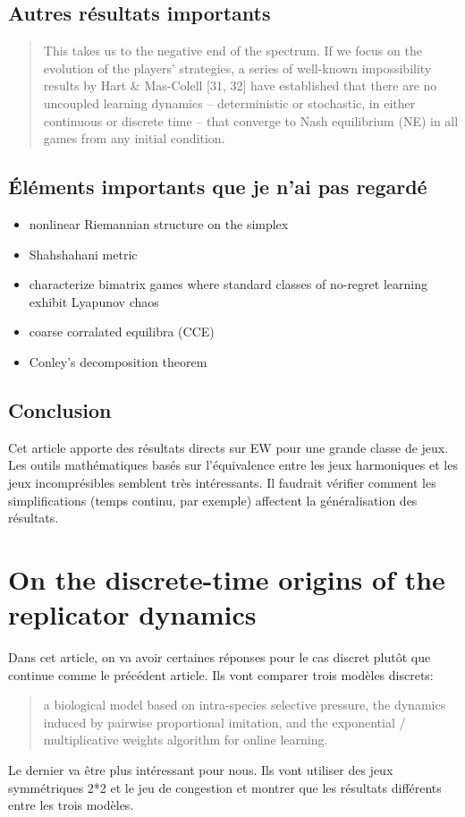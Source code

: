 \documentclass{article}
\begin{document}

\subsection{Autres résultats importants}
\begin{quote}
    This takes us to the negative end of the spectrum. If we focus on the evolution of the players’ strategies, a series of well-known impossibility results by Hart & Mas-Colell [31, 32] have established that there are no uncoupled learning dynamics – deterministic or stochastic, in either continuous or discrete time – that converge to Nash equilibrium (NE) in all games from any initial condition.
\end{quote}

\subsection{Éléments importants que je n'ai pas regardé}
\begin{itemize}
    \item nonlinear Riemannian structure on the simplex
    \item Shahshahani metric
    \item characterize bimatrix games where standard classes of no-regret learning exhibit Lyapunov chaos
    \item coarse corralated equilibra (CCE)
    \item Conley’s decomposition theorem
\end{itemize}

\subsection{Conclusion}
Cet article apporte des résultats directs sur EW pour une grande classe de jeux. 
\\ Les outils mathématiques basés sur l'équivalence entre les jeux harmoniques et les jeux incomprésibles semblent très intéressants. Il faudrait vérifier comment les simplifications (temps continu, par exemple) affectent la généralisation des résultats.

\section{On the discrete-time origins of the replicator dynamics \cite{falniowski_discrete-time_2024}}
Dans cet article, on va avoir certaines réponses pour le cas discret plutôt que continue comme le précédent article.
Ils vont comparer trois modèles discrets: 
\begin{quote}
    a biological model based on intra-species selective pressure, the dynamics induced by pairwise proportional imitation, and the exponential / multiplicative weights algorithm for online learning.
\end{quote}
Le dernier va être plus intéressant pour nous. 
Ils vont utiliser des jeux symmétriques 2*2 et le jeu de congestion et montrer que les résultats différents entre les trois modèles. 
\end{document}
